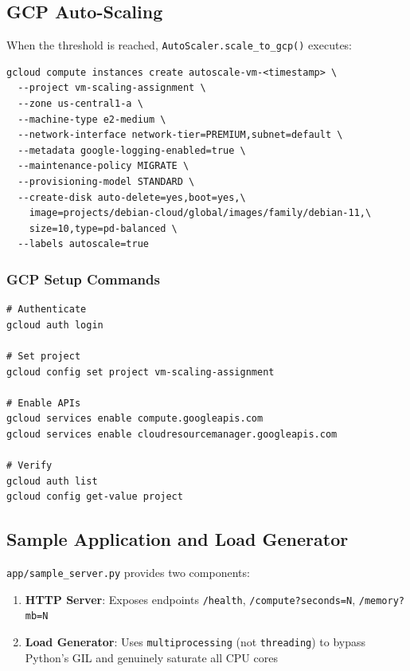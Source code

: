 \documentclass[12pt,a4paper]{article}
\begin{document}
\subsection{GCP Auto-Scaling}

When the threshold is reached, \texttt{AutoScaler.scale\_to\_gcp()} executes:

\begin{lstlisting}[style=bashstyle, caption={Generated gcloud command}]
gcloud compute instances create autoscale-vm-<timestamp> \
  --project vm-scaling-assignment \
  --zone us-central1-a \
  --machine-type e2-medium \
  --network-interface network-tier=PREMIUM,subnet=default \
  --metadata google-logging-enabled=true \
  --maintenance-policy MIGRATE \
  --provisioning-model STANDARD \
  --create-disk auto-delete=yes,boot=yes,\
    image=projects/debian-cloud/global/images/family/debian-11,\
    size=10,type=pd-balanced \
  --labels autoscale=true
\end{lstlisting}

\subsubsection{GCP Setup Commands}

\begin{lstlisting}[style=bashstyle, caption={GCP configuration}]
# Authenticate
gcloud auth login

# Set project
gcloud config set project vm-scaling-assignment

# Enable APIs
gcloud services enable compute.googleapis.com
gcloud services enable cloudresourcemanager.googleapis.com

# Verify
gcloud auth list
gcloud config get-value project
\end{lstlisting}

\subsection{Sample Application and Load Generator}

\texttt{app/sample\_server.py} provides two components:

\begin{enumerate}
    \item \textbf{HTTP Server}: Exposes endpoints \texttt{/health}, \texttt{/compute?seconds=N}, \texttt{/memory?mb=N}
    \item \textbf{Load Generator}: Uses \texttt{multiprocessing} (not \texttt{threading}) to bypass Python's GIL and genuinely saturate all CPU cores
\end{enumerate}
\end{document}
